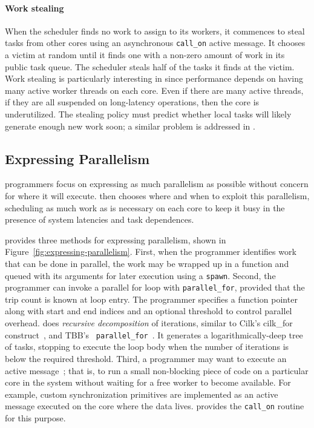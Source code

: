 \paragraph{Work stealing} 
When the scheduler finds no work to assign to its workers, it commences to
steal tasks from other cores using an asynchronous \texttt{call\_on} active
message. It chooses a victim at random until it finds one with a non-zero
amount of work in its public task queue. The scheduler steals half of the
tasks it finds at the victim. Work stealing is particularly interesting in
\Grappa since performance depends on having many active worker threads on each
core. Even if there are many active threads, if they are all suspended on
long-latency operations, then the core is underutilized. 
The
stealing policy 
must predict whether local tasks will likely
generate enough new work soon; a similar problem is addressed in
\cite{vanNieuwpoort:2001}.

\subsection{Expressing Parallelism}


\Grappa programmers focus on expressing as much parallelism as possible
without concern for where it will execute. \Grappa then chooses where and when
to exploit this parallelism, scheduling as much work as is necessary on each
core to keep it busy in the presence of system latencies and task dependences.

\Grappa provides three methods for expressing parallelism, shown in
Figure~\ref{fig:expressing-parallelism}. First, when the programmer identifies
work that can be done in parallel, the work may be wrapped up in a function
and queued with its arguments for later execution using a \texttt{spawn}.
Second,
the programmer can invoke a parallel for loop with \texttt{parallel\_for}, provided that the trip count is
known at loop entry. The programmer specifies a function pointer along with
start and end indices and an optional threshold to control parallel overhead.
\Grappa does {\em recursive decomposition} of iterations, similar to Cilk's
cilk\_for construct~\cite {cilkforimplementation}, and TBB's {\tt
parallel\_for}~\cite{intel_tbb}. It generates a logarithmically-deep tree of
tasks, stopping to execute the loop body when the number of iterations is
below the required threshold. Third, a programmer may want to execute an active message~\cite{vonEicken92}; that is, to run a
small non-blocking piece of code on a particular core in the system without waiting for
 a free worker to become available. For example, custom synchronization primitives are implemented as an active message executed on the core where the data
lives. \Grappa provides the \texttt{call\_on} routine for this purpose.

